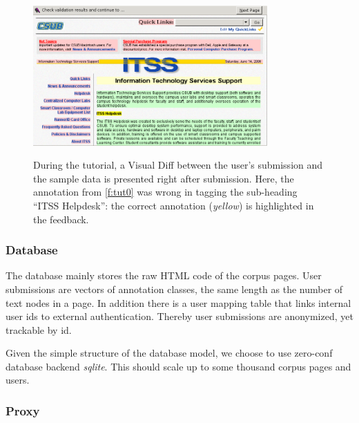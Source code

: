 \begin{figure}
	{\includegraphics[width=0.8\textwidth]{tut1}}
\caption{\label{f:tut1}During the tutorial, a Visual Diff between the user's submission and the sample data is presented right after submission.
	Here, the annotation from \ref{f:tut0} was wrong in tagging the sub-heading ``ITSS Helpdesk'': the correct annotation (\textit{yellow}) is highlighted in the feedback.}
\end{figure}

\subsubsection{Database}

The database mainly stores the raw HTML code of the corpus pages.
User submissions are vectors of annotation classes, the same length as the number of text nodes in a page.
In addition there is a user mapping table that links internal user ids to external authentication.
Thereby user submissions are anonymized, yet trackable by id.

Given the simple structure of the database model, we choose to use zero-conf database backend \textit{sqlite}.
This should scale up to some thousand corpus pages and users.

\subsubsection{Proxy}

